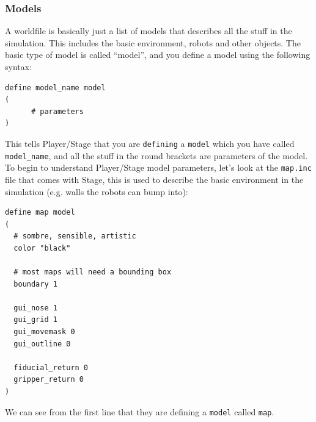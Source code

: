 \documentclass[a4paper]{article}
\newcommand{\plst}{Player/Stage\xspace}
\begin{document}
\subsubsection{Models} \label{sec:models}
A worldfile is basically just a list of models that describes all the stuff in the simulation. This includes the basic environment, robots and other objects. The basic type of model is called ``model'', and you define a model using the following syntax:
\begin{verbatim}
define model_name model
(
      # parameters
)
\end{verbatim}
This tells \plst that you are \verb|defining| a \verb|model| which you have called \verb|model_name|, and all the stuff in the round brackets are parameters of the model. To begin to understand \plst model parameters, let's look at the \verb|map.inc| file that comes with Stage, this is used to describe the basic environment in the simulation (e.g. walls the robots can bump into):
\begin{verbatim}
define map model
(
  # sombre, sensible, artistic
  color "black"

  # most maps will need a bounding box
  boundary 1

  gui_nose 1
  gui_grid 1
  gui_movemask 0
  gui_outline 0
 
  fiducial_return 0
  gripper_return 0
)
\end{verbatim}
We can see from the first line that they are defining a \verb|model| called \verb|map|. 
\end{document}
